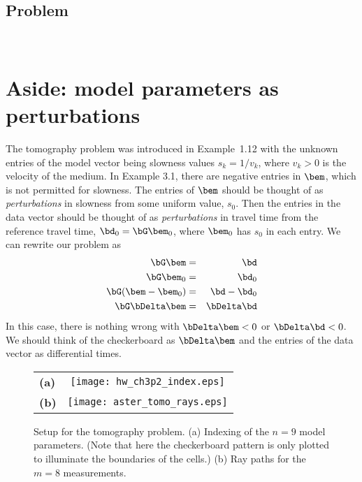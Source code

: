 \documentclass[11pt,titlepage,fleqn]{article}
\begin{document}

\subsection*{Problem} \howmuchtime\

\pagebreak

\nocite{AsterE2}



\appendix

\section{Aside: model parameters as perturbations}
\label{sec:pert}

The tomography problem was introduced in Example~1.12 with the unknown entries of the model vector being slowness values $s_k = 1/v_k$, where $v_k > 0$ is the velocity of the medium. In \citet{AsterE2} Example 3.1, there are negative entries in $\bem$, which is not permitted for slowness. The entries of $\bem$ should be thought of as {\em perturbations} in slowness from some uniform value, $s_0$. Then the entries in the data vector should be thought of as {\em perturbations} in travel time from the reference travel time, $\bd_0 = \bG\bem_0$, where $\bem_0$ has $s_0$ in each entry. We can rewrite our problem as
%
\begin{eqnarray}
\bG\bem &=& \bd
\\
\bG\bem_0 &=& \bd_0
\\
\bG(\bem - \bem_0) &=& \bd - \bd_0
\\
\bG\bDelta\bem &=& \bDelta\bd
\end{eqnarray}
%
In this case, there is nothing wrong with $\bDelta\bem < 0$ or $\bDelta\bd < 0$. We should think of the checkerboard as $\bDelta\bem$ and the entries of the data vector as differential times.



\begin{figure}[h]
\centering
\begin{tabular}{lc}
{\bf(a)} & \texttt{[image: hw\_ch3p2\_index.eps]} \\
{\bf(b)} & \texttt{[image: aster\_tomo\_rays.eps]} \\
\end{tabular}
\caption[]
{{
Setup for the tomography problem.
(a) Indexing of the $n=9$ model parameters.
(Note that here the checkerboard pattern is only plotted to illuminate the boundaries of the cells.)
(b) Ray paths for the $m=8$ measurements.
\label{fig:index}
}}
\end{figure} 


\end{document}
